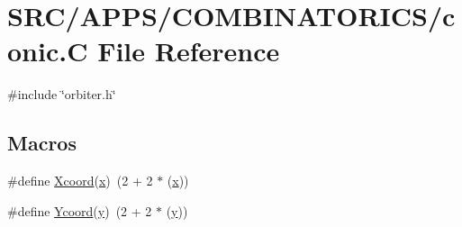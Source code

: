 \hypertarget{conic_8_c}{}\section{S\+R\+C/\+A\+P\+P\+S/\+C\+O\+M\+B\+I\+N\+A\+T\+O\+R\+I\+C\+S/conic.C File Reference}
\label{conic_8_c}
{\ttfamily \#include \char`\"{}orbiter.\+h\char`\"{}}\newline
\subsection*{Macros}
\begin{DoxyCompactItemize}
\item 
\#define \mbox{\hyperlink{conic_8_c_aa8e7ccceb3ca86c0b79e9809bf4fab24}{Xcoord}}(\mbox{\hyperlink{alphabet2_8_c_a6150e0515f7202e2fb518f7206ed97dc}{x}})~(2 + 2 $\ast$ (\mbox{\hyperlink{alphabet2_8_c_a6150e0515f7202e2fb518f7206ed97dc}{x}}))
\item 
\#define \mbox{\hyperlink{conic_8_c_a1c871929eac32ccd1fab70e86125bbab}{Ycoord}}(\mbox{\hyperlink{alphabet2_8_c_a0a2f84ed7838f07779ae24c5a9086d33}{y}})~(2 + 2 $\ast$ (\mbox{\hyperlink{alphabet2_8_c_a0a2f84ed7838f07779ae24c5a9086d33}{y}}))
\end{DoxyCompactItemize}
